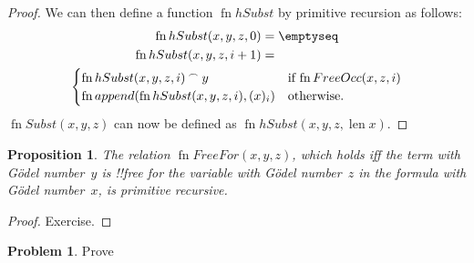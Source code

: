 \documentclass[10pt,a4paper]{article}
\makeatletter
\theoremstyle{plain}
\newtheorem{prop}[thm]{Proposition}
\theoremstyle{definition}
\newtheorem{prob}{Problem}[section]
\theoremstyle{remark}
\newcommand*{\ollabel}[1]{\label{#1}}
\newcommand{\olref}{\@ifnextchar[{\olref@i}{\olref@final}}
\def\olref@i[#1]{\@ifnextchar[{\olref@ii}{\olref@final}}
\def\olref@ii[#1]{\@ifnextchar[{\olref@iii}{\olref@final}}
\def\olref@iii[#1]{\olref@final}
\def\olref@final#1{\ref{#1}}
\providecommand{\len}{\operatorname{len}}
\providecommand{\concat}{\mathbin{{}^\frown}}
\providecommand{\fn}{\operatorname{fn}}
\providecommand{\fn}{\operatorname{fn}}
\makeatother
\begin{document}
\begin{proof}
We can then define a function $\fn{hSubst}$ by primitive recursion as
follows:
\begin{multline*}
\begin{aligned}
\fn{hSubst}(x, y, z, 0) & = \emptyseq \\
\fn{hSubst}(x, y, z, i+1) & =
\end{aligned}\\
\begin{cases}
\fn{hSubst}(x, y, z, i) \concat y & \text{if $\fn{FreeOcc}(x, z, i)$} \\
\fn{append}(\fn{hSubst}(x, y, z, i), (x)_{i}) & \text{otherwise.}
\end{cases}
\end{multline*}
$\fn{Subst}(x, y, z)$ can now be defined as $\fn{hSubst}(x, y, z, \len{x})$.
\end{proof}

\begin{prop}
\ollabel{prop:free-for}
The relation $\fn{FreeFor}(x, y, z)$, which holds iff the term with
G\"odel number~$y$ is !!{free for} the variable with G\"odel
number~$z$ in the formula with G\"odel number~$x$, is primitive
recursive.
\end{prop}

\begin{proof} Exercise. \end{proof}

\begin{prob}
Prove \olref[inc][art][sub]{prop:free-for}
\end{prob}
\end{document}
